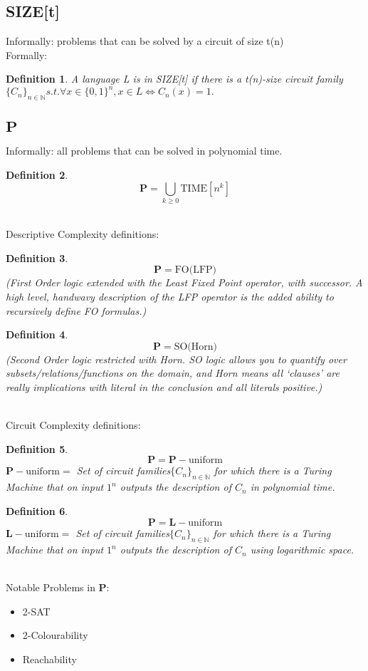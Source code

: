 \documentclass[]{article}
\theoremstyle{break}
\theoremstyle{break}
\newtheorem{definition}{Definition}[section]
\begin{document}
\subsection{SIZE[t]}
\label{sec:size}
Informally: problems that can be solved by a circuit of size t(n)
\\
Formally:
\begin{definition}
	A language L is in SIZE[t] if there is a t(n)-size circuit
	family $ \{ C_n \}_{n\in \mathbb{N}} s.t. \forall x \in \{0, 1\}^n, x \in L \iff C_n(x) = 1.$
\end{definition}

\subsection{$\mathbf{P}$}
\label{sec:P}
Informally: all problems that can be solved in polynomial time.
\begin{definition}
	$$\mathbf{P} = \bigcup_{k\geq 0} \hyperref[sec:TIME]{\text{TIME}}[n^{k}]$$
\end{definition}
$ $
\\
\\
Descriptive Complexity definitions: 
\begin{definition}
	$$\mathbf{P} = \text{FO(LFP)}$$
(First Order logic extended with the Least Fixed Point operator, with successor. A high level, handwavy description of the LFP operator is the added ability to recursively define FO formulas.)
\end{definition}
\begin{definition}
	$$\mathbf{P} = \text{SO(Horn)}$$
(Second Order logic restricted with Horn. SO logic allows you to quantify over subsets/relations/functions on the domain, and Horn means all `clauses' are really implications with literal in the conclusion and all literals positive.)
\end{definition}
$ $
\\
\\
Circuit Complexity definitions:
\begin{definition}
	$$\textbf{P} = \textbf{P}-\text{uniform}$$
	$\textbf{P}-\text{uniform} = $ Set of circuit families$\{C_n\}_{n\in\mathbb{N}}$ for which there is a Turing Machine that on input $1^n $ outputs the description of $ C_n$ in polynomial time.
\end{definition}
\begin{definition}
	$$\textbf{P} = \hyperref[sec:L]{\textbf{L}}-\text{uniform}$$
	$\textbf{L}-\text{uniform} = $ Set of circuit families$\{C_n\}_{n\in\mathbb{N}}$ for which there is a Turing Machine that on input $1^n $ outputs the description of $ C_n$ using logarithmic space. 
\end{definition}
$ $
\\
\\
Notable Problems in $\mathbf{P}$:
\begin{itemize}
	\item 2-SAT
	\item 2-Colourability
	\item Reachability
\end{itemize}
\end{document}
